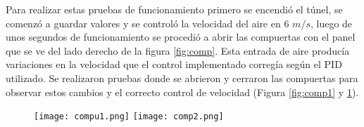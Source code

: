 Para realizar estas pruebas de funcionamiento primero se encendió el túnel, se comenzó a guardar valores y se controló la velocidad del aire en 6 $m/s$, luego de unos segundos de funcionamiento se procedió a abrir las compuertas con el panel que se ve del lado derecho de la figura \ref{fig:comp}. Esta entrada de aire producía variaciones en la velocidad que el control implementado corregía según el PID utilizado. Se realizaron pruebas donde se abrieron y cerraron las compuertas para observar estos cambios y el correcto control de velocidad (Figura \ref{fig:comp1} y \ref{fig:comp2}).


\begin{figure}[H]
	\centering
	\texttt{[image: compu1.png]}
	\label{fig:comp1}
	\texttt{[image: comp2.png]}
	\label{fig:comp2}
\end{figure}



    \newpage